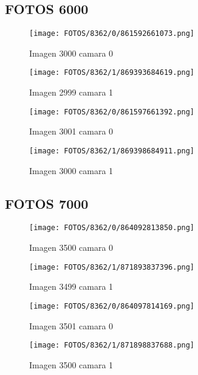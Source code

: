 \documentclass{article}
\begin{document}
\subsection{FOTOS 6000}

\begin{figure}[H]
  \centering
  \begin{minipage}[b]{0.45\textwidth}
    \centering
    \texttt{[image: FOTOS/8362/0/861592661073.png]}
    \caption{Imagen 3000 camara 0}
  \end{minipage}
  \begin{minipage}[b]{0.45\textwidth}
    \centering
    \texttt{[image: FOTOS/8362/1/869393684619.png]}
    \caption{Imagen 2999 camara 1}
  \end{minipage}
  \begin{minipage}[b]{0.45\textwidth}
    \centering
    \texttt{[image: FOTOS/8362/0/861597661392.png]}
    \caption{Imagen 3001 camara 0}
  \end{minipage}
  \begin{minipage}[b]{0.45\textwidth}
    \centering
    \texttt{[image: FOTOS/8362/1/869398684911.png]}
    \caption{Imagen 3000 camara 1}
  \end{minipage}
\end{figure}

\subsection{FOTOS 7000}

\begin{figure}[H]
  \centering
  \begin{minipage}[b]{0.45\textwidth}
    \centering
    \texttt{[image: FOTOS/8362/0/864092813850.png]}
    \caption{Imagen 3500 camara 0}
  \end{minipage}
  \begin{minipage}[b]{0.45\textwidth}
    \centering
    \texttt{[image: FOTOS/8362/1/871893837396.png]}
    \caption{Imagen 3499 camara 1}
  \end{minipage}
  \begin{minipage}[b]{0.45\textwidth}
    \centering
    \texttt{[image: FOTOS/8362/0/864097814169.png]}
    \caption{Imagen 3501 camara 0}
  \end{minipage}
  \begin{minipage}[b]{0.45\textwidth}
    \centering
    \texttt{[image: FOTOS/8362/1/871898837688.png]}
    \caption{Imagen 3500 camara 1}
  \end{minipage}
\end{figure}
\end{document}
